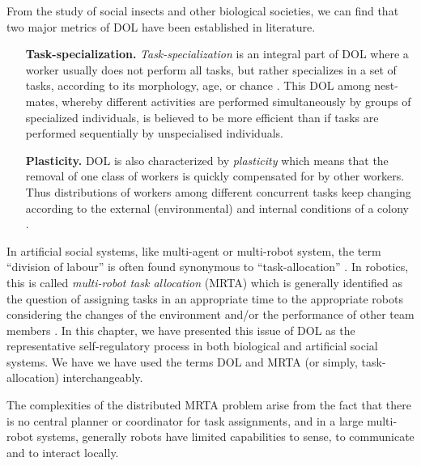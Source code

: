 \documentclass{intech}
\begin{document}
From the study of social insects and other biological societies, we can find that two major metrics of DOL have been established in literature.
\begin{enumerate}
\item[\textbf{Task-specialization.}]
{\em Task-specialization} is an integral part of DOL where a worker usually does not perform all tasks, but rather specializes in a set of tasks, according to its morphology, age, or chance \citep{Bonabeau+1999}. This DOL among nest-mates, whereby different activities are performed simultaneously by groups of specialized individuals, is believed to be more efficient than if tasks are performed sequentially by unspecialised individuals.
%
\item[\textbf{Plasticity.}]
DOL is also characterized by {\em plasticity} which means that the removal of one class of workers is quickly compensated for by other workers. Thus distributions of workers among different concurrent tasks keep changing according to the external (environmental) and internal conditions of a colony \citep{Garnier+2007}. 
\end{enumerate}

In artificial social systems, like multi-agent or multi-robot system, the term ``division of labour'' is often found synonymous to ``task-allocation'' \citep{Shen+2001}. In robotics, this is called \textit{multi-robot task allocation} (MRTA) which is generally identified as the question of assigning tasks in an appropriate time to the appropriate robots considering the changes of the environment and/or the performance of other team members \citep{Gerkey+2004}. In this chapter, we have presented this issue of DOL as the representative self-regulatory process in both biological and artificial social systems. We have we have used the terms DOL and MRTA (or simply, task-allocation) interchangeably. 

The complexities of the distributed MRTA problem arise from the fact that there is no central planner or coordinator for task assignments, and in a large multi-robot systems, generally robots have limited capabilities to sense, to communicate and to interact locally.
\end{document}
